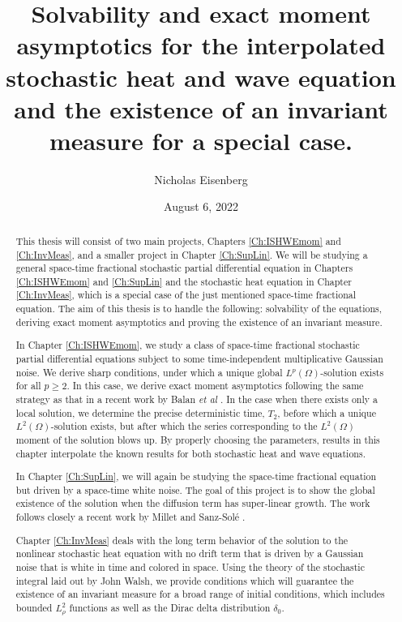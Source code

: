 \documentclass[12pt]{report}
\title{Solvability and exact moment asymptotics for the interpolated stochastic heat and wave equation and the existence of an invariant measure for a special case.}
\author{Nicholas Eisenberg}
\date{August 6, 2022} %
\theoremstyle{plain}
\theoremstyle{definition}
\numberwithin{equation}{section}
\begin{document}
\begin{romanpages}      %

\TitlePage 

\begin{abstract} 
This thesis will consist of two main projects, Chapters \ref{Ch:ISHWEmom} and \ref{Ch:InvMeas}, and a smaller project in Chapter \ref{Ch:SupLin}. We will be studying a general space-time fractional stochastic partial differential equation in Chapters \ref{Ch:ISHWEmom} and \ref{Ch:SupLin} and the stochastic heat equation in Chapter \ref{Ch:InvMeas}, which is a special case of the just mentioned space-time fractional equation. The aim of this thesis is to handle the following: solvability of the equations, deriving exact moment asymptotics and proving the existence of an invariant measure.
	
In Chapter \ref{Ch:ISHWEmom}, we study a class of space-time fractional stochastic partial differential equations subject to some time-independent multiplicative Gaussian noise.
We derive sharp conditions, under which a unique global $L^p(\Omega)$-solution exists for all
$p\ge 2$. In this case, we derive exact moment asymptotics following the same strategy as that in
a recent work by Balan {\it et al} \cite{balan.chen.ea:22:exact}. In the case when there exists only a local
solution, we determine the precise deterministic time, $T_2$, before which a unique
$L^2(\Omega)$-solution exists, but after which the series corresponding to the $L^2(\Omega)$
moment of the solution blows up. By properly choosing the parameters, results in this chapter
interpolate the known results for both stochastic heat and wave equations. 

In Chapter \ref{Ch:SupLin}, we will again be studying the space-time fractional equation but driven by a space-time white noise. The goal of this project is to show the global existence of the solution when the diffusion term has super-linear growth. The work follows closely a recent work by Millet and Sanz-Sol\'e \cite{millet.sanz-sole:21:global}. 

Chapter \ref{Ch:InvMeas} deals with the long term behavior of the solution to the nonlinear stochastic heat
equation with no drift term that is driven by a Gaussian noise that is white in time and colored in space. Using the theory of
the stochastic integral laid out by John Walsh, we provide conditions which will guarantee the
existence of an invariant measure for a broad range of initial conditions, which includes bounded
$L^2_\rho$ functions as well as the Dirac delta distribution $\delta_0$. 
\end{abstract}


\end{romanpages}
\end{document}
